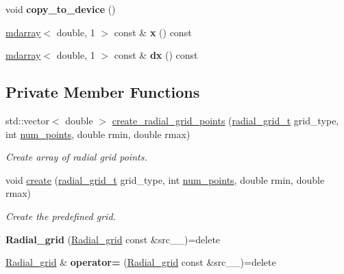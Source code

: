 \begin{DoxyCompactItemize}
\item 
\hypertarget{classsirius_1_1_radial__grid_a5c801cc5c32e61b07feb9dc822096fae}{}void {\bfseries copy\+\_\+to\+\_\+device} ()\label{classsirius_1_1_radial__grid_a5c801cc5c32e61b07feb9dc822096fae}

\item 
\hypertarget{classsirius_1_1_radial__grid_abad0dd470b29afcb64b872e6846f431f}{}\hyperlink{classsddk_1_1mdarray}{mdarray}$<$ double, 1 $>$ const \& {\bfseries x} () const \label{classsirius_1_1_radial__grid_abad0dd470b29afcb64b872e6846f431f}

\item 
\hypertarget{classsirius_1_1_radial__grid_a8850ba5832b00d70fc1a9b130bbad49b}{}\hyperlink{classsddk_1_1mdarray}{mdarray}$<$ double, 1 $>$ const \& {\bfseries dx} () const \label{classsirius_1_1_radial__grid_a8850ba5832b00d70fc1a9b130bbad49b}

\end{DoxyCompactItemize}
\subsection*{Private Member Functions}
\begin{DoxyCompactItemize}
\item 
std\+::vector$<$ double $>$ \hyperlink{classsirius_1_1_radial__grid_a0b0694623d36d495796ceb5f393691ef}{create\+\_\+radial\+\_\+grid\+\_\+points} (\hyperlink{namespacesirius_a9c2875496b6736959baaf053c21dafb0}{radial\+\_\+grid\+\_\+t} grid\+\_\+type, int \hyperlink{classsirius_1_1_radial__grid_ae4775a4fff1a0852d934684d1939a824}{num\+\_\+points}, double rmin, double rmax)
\begin{DoxyCompactList}\small\item\em Create array of radial grid points. \end{DoxyCompactList}\item 
void \hyperlink{classsirius_1_1_radial__grid_a02aa9e9d953cdefe1a8c5f5e8d100dd7}{create} (\hyperlink{namespacesirius_a9c2875496b6736959baaf053c21dafb0}{radial\+\_\+grid\+\_\+t} grid\+\_\+type, int \hyperlink{classsirius_1_1_radial__grid_ae4775a4fff1a0852d934684d1939a824}{num\+\_\+points}, double rmin, double rmax)
\begin{DoxyCompactList}\small\item\em Create the predefined grid. \end{DoxyCompactList}\item 
\hypertarget{classsirius_1_1_radial__grid_a9c62b2f44c52990f1eb9ad827f9829bc}{}{\bfseries Radial\+\_\+grid} (\hyperlink{classsirius_1_1_radial__grid}{Radial\+\_\+grid} const \&src\+\_\+\+\_\+)=delete\label{classsirius_1_1_radial__grid_a9c62b2f44c52990f1eb9ad827f9829bc}

\item 
\hypertarget{classsirius_1_1_radial__grid_a08651b3aa6624ff7a8440e4842c56781}{}\hyperlink{classsirius_1_1_radial__grid}{Radial\+\_\+grid} \& {\bfseries operator=} (\hyperlink{classsirius_1_1_radial__grid}{Radial\+\_\+grid} const \&src\+\_\+\+\_\+)=delete\label{classsirius_1_1_radial__grid_a08651b3aa6624ff7a8440e4842c56781}

\end{DoxyCompactItemize}
